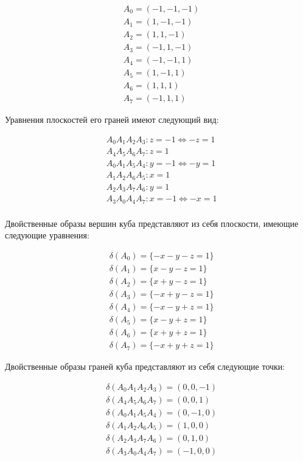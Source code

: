 \documentclass[a4paper, 12pt, titlepage]{article}
\theoremstyle{definition}
\theoremstyle{plain}
\theoremstyle{plain}
\begin{document}
\begin{align*}
 & A_{0} = (-1, -1, -1) \\ & A_{1} = (1, -1, -1) \\
 & A_{2} = (1, 1, -1)   \\ & A_{3} = (-1, 1, -1) \\
 & A_{4} = (-1, -1, 1)  \\ & A_{5} = (1, -1, 1)  \\
 & A_{6} = (1, 1, 1)    \\ & A_{7} = (-1, 1, 1)
\end{align*}

Уравнения плоскостей его граней имеют следующий вид:

\begin{align*}
 & A_{0} A_{1} A_{2} A_{3} : z = -1 \Leftrightarrow -z = 1 \\
 & A_{4} A_{5} A_{6} A_{7} : z = 1 \\
 & A_{0} A_{1} A_{5} A_{4} : y = -1 \Leftrightarrow -y = 1 \\
 & A_{1} A_{2} A_{6} A_{5} : x = 1 \\
 & A_{2} A_{3} A_{7} A_{6} : y = 1 \\
 & A_{3} A_{0} A_{4} A_{7} : x = -1 \Leftrightarrow -x = 1 \\
\end{align*}


Двойственные образы вершин куба представляют из себя плоскости, имеющие
следующие уравнения:

\begin{align*}
 & \delta(A_{0}) = \{ -x - y - z = 1 \} \\
 & \delta(A_{1}) = \{  x - y - z = 1 \} \\
 & \delta(A_{2}) = \{  x + y - z = 1 \} \\
 & \delta(A_{3}) = \{ -x + y - z = 1 \} \\
 & \delta(A_{4}) = \{ -x - y + z = 1 \} \\
 & \delta(A_{5}) = \{  x - y + z = 1 \} \\
 & \delta(A_{6}) = \{  x + y + z = 1 \} \\
 & \delta(A_{7}) = \{ -x + y + z = 1 \}
\end{align*}

Двойственные образы граней куба представляют из себя следующие точки:

\begin{align*}
 & \delta(A_{0} A_{1} A_{2} A_{3}) = ( 0,  0, -1) \\
 & \delta(A_{4} A_{5} A_{6} A_{7}) = ( 0,  0,  1) \\
 & \delta(A_{0} A_{1} A_{5} A_{4}) = ( 0, -1,  0) \\
 & \delta(A_{1} A_{2} A_{6} A_{5}) = ( 1,  0,  0) \\
 & \delta(A_{2} A_{3} A_{7} A_{6}) = ( 0,  1,  0) \\
 & \delta(A_{3} A_{0} A_{4} A_{7}) = (-1,  0,  0)
\end{align*}
\end{document}
